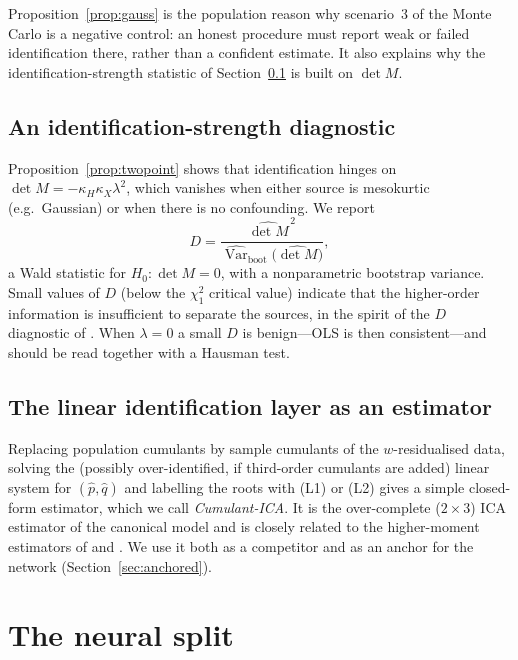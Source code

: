\documentclass[11pt]{article}
\theoremstyle{definition}
\theoremstyle{remark}
\newcommand{\Var}{\operatorname{Var}}
\begin{document}
Proposition~\ref{prop:gauss} is the population reason why scenario~3 of the Monte Carlo is a
negative control: an honest procedure must report weak or failed identification there, rather than
a confident estimate. It also explains why the identification-strength statistic of
Section~\ref{sec:diagnostic} is built on $\det M$.

\subsection{An identification-strength diagnostic}\label{sec:diagnostic}

Proposition~\ref{prop:twopoint} shows that identification hinges on $\det M = -\kappa_H\kappa_X
\lambda^2$, which vanishes when either source is mesokurtic (e.g.\ Gaussian) or when there is no
confounding. We report
\begin{equation}\label{eq:D}
  D = \frac{\widehat{\det M}^{\,2}}{\widehat{\Var}_{\mathrm{boot}}\big(\widehat{\det M}\big)},
\end{equation}
a Wald statistic for $H_0:\det M = 0$, with a nonparametric bootstrap variance. Small values of $D$
(below the $\chi^2_1$ critical value) indicate that the higher-order information is insufficient to
separate the sources, in the spirit of the $D$ diagnostic of \citet{delbianco2026}. When $\lambda=0$
a small $D$ is benign---OLS is then consistent---and should be read together with a Hausman test.

\subsection{The linear identification layer as an estimator}

Replacing population cumulants by sample cumulants of the $w$-residualised data, solving the
(possibly over-identified, if third-order cumulants are added) linear system for $(\hat p,\hat q)$ and
labelling the roots with (L1) or (L2) gives a simple closed-form estimator, which we call
\emph{Cumulant-ICA}. It is the over-complete ($2\times3$) ICA estimator of the canonical model and
is closely related to the higher-moment estimators of \citet{lewbel1997} and \citet{erickson2002}.
We use it both as a competitor and as an anchor for the network (Section~\ref{sec:anchored}).

\section{The neural split}\label{sec:network}
\end{document}
